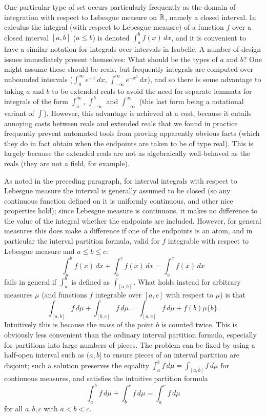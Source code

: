 \documentclass[leqno]{article}
\theoremstyle{definition}
\begin{document}
One particular type of set occurs particularly frequently as the domain of integration with respect to Lebesgue measure on $\mathbb{R}$, namely a closed interval. In calculus the integral (with respect to Lebesgue meausre) of a function $f$ over a closed interval $[a,b]$ ($a \le b$) is denoted $\int_a^b f(x) \, dx$, and it is convenient to have a similar notation for integrals over intervals in Isabelle. A number of design issues immediately present themselves: What should be the types of $a$ and $b$? One might assume these should be reals, but frequently integrals are computed over unbounded intervals ($\int_0^\infty e^{-x} \, dx$, $\int_{-\infty}^\infty e^{-x^2} \, dx$), and so there is some advantage to taking $a$ and $b$ to be extended reals to avoid the need for separate lemmata for integrals of the form $\int_a^\infty$, $\int_{-\infty}^b$ and $\int_{-\infty}^\infty$ (this last form being a notational variant of $\int$). However, this advantage is achieved at a cost, because it entails annoying casts between reals and extended reals that we found in practice frequently prevent automated tools from proving apparently obvious facts (which they do in fact obtain when the endpoints are taken to be of type real). This is largely because the extended reals are not as algebraically well-behaved as the reals (they are not a field, for example).

As noted in the preceding paragraph, for interval integrals with respect to Lebesgue measure the interval is generally assumed to be closed (so any continuous function defined on it is uniformly continuous, and other nice properties hold); since Lebesgue measure is continuous, it makes no difference to the value of the integral whether the endpoints are included. However, for general measures this does make a difference if one of the endpoints is an atom, and in particular the interval partition formula, valid for $f$ integrable with respect to Lebesgue measure and $a \le b \le c$:
\[ \int_a^b f(x) \, dx + \int_b^c f(x) \, dx = \int_a^c f(x) \, dx \]
fails in general if $\int_a^b$ is defined as $\int_{[a,b]}$. What holds instead for arbitrary measures $\mu$ (and functions $f$ integrable over $[a,c]$ with respect to $\mu$) is that
\[ \int_{[a,b]} f \, d\mu + \int_{[b,c]} f \, d\mu = \int_{[a,c]} f \, d\mu + f(b)\mu \{b\}. \]
Intuitively this is because the mass of the point $b$ is counted twice. This is obviously less convenient than the ordinary interval partition formula, especially for partitions into large numbers of pieces. The problem can be fixed by using a half-open interval such as $(a,b]$ to ensure pieces of an interval partition are disjoint; such a solution preserves the equality $\int_a^b f \, d\mu = \int_{[a,b]} f \, d\mu$ for continuous measures, and satisfies the intuitive partition formula
\[ \int_a^b f \, d\mu + \int_b^c f \, d\mu = \int_a^c f \, d\mu \]
for all $a,b,c$ with $a < b < c$.
\end{document}
